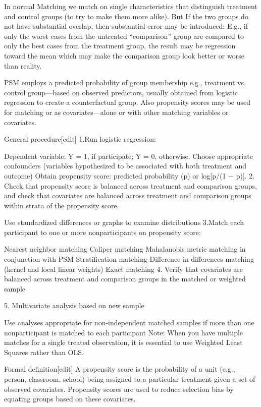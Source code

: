 In normal Matching we match on single characteristics that distinguish treatment and control groups (to try to make them more alike). But If the two groups do not have substantial overlap, then substantial error may be introduced: E.g., if only the worst cases from the untreated “comparison” group are compared to only the best cases from the treatment group, the result may be regression toward the mean which may make the comparison group look better or worse than reality.

PSM employs a predicted probability of group membership e.g., treatment vs. control group—based on observed predictors, usually obtained from logistic regression to create a counterfactual group. Also propensity scores may be used for matching or as covariates—alone or with other matching variables or covariates.

General procedure[edit]
1.Run logistic regression:

Dependent variable: Y = 1, if participate; Y = 0, otherwise.
Choose appropriate confounders (variables hypothesized to be associated with both treatment and outcome)
Obtain propensity score: predicted probability (p) or log[p/(1 − p)].
2. Check that propensity score is balanced across treatment and comparison groups, and check that covariates are balanced across treatment and comparison groups within strata of the propensity score.

Use standardized differences or graphs to examine distributions
3.Match each participant to one or more nonparticipants on propensity score:

Nearest neighbor matching
Caliper matching
Mahalanobis metric matching in conjunction with PSM
Stratification matching
Difference-in-differences matching (kernel and local linear weights)
Exact matching
4. Verify that covariates are balanced across treatment and comparison groups in the matched or weighted sample

5. Multivariate analysis based on new sample

Use analyses appropriate for non-independent matched samples if more than one nonparticipant is matched to each participant
Note: When you have multiple matches for a single treated observation, it is essential to use Weighted Least Squares rather than OLS.

Formal definition[edit]
A propensity score is the probability of a unit (e.g., person, classroom, school) being assigned to a particular treatment given a set of observed covariates. Propensity scores are used to reduce selection bias by equating groups based on these covariates.

